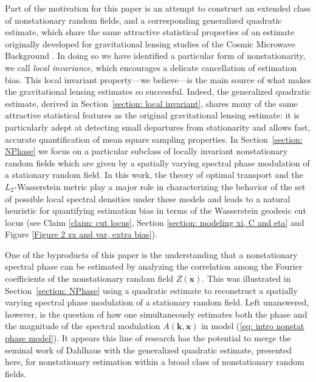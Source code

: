 \documentclass[10pt,noinfoline]{imsart}
\newcommand{\bs}{\boldsymbol}
\begin{document}
Part of the motivation for this paper is an attempt to construct an extended class of nonstationary random fields, and a corresponding generalized quadratic estimate, which share the same attractive statistical properties of an estimate originally developed for gravitational lensing studies of the Cosmic Microwave Background \cite{hu2001mapping, hu2002mass}.  In doing so we have identified a particular form of nonstationarity, we call {\it local invariance}, which encourages a delicate cancellation of estimation bias. This local invariant property---we believe---is the main source of what makes the gravitational lensing estimates so successful.  Indeed, the generalized quadratic estimate, derived in Section~\ref{section: local invariant}, shares many of the same attractive statistical features as the original gravitational lensing estimate: it is particularly adept at detecting small departures from stationarity and allows fast, accurate quantification of mean square sampling properties.  In Section~\ref{section: NPhase} we focus on a particular subclass of locally invariant nonstationary random fields which are given by a spatially varying spectral phase modulation of a stationary random field. In this work, the theory of optimal transport and the $L_2$-Wasserstein metric play a major role in characterizing the behavior of the set of possible local spectral densities under these models and leads to a natural heuristic for quantifying estimation bias in terms of the Wasserstein geodesic cut locus (see Claim \ref{claim: cut locus}, Section \ref{section: modeling xi, C and eta} and Figure \ref{Figure 2 zx and var, extra bias}).

One of the byproducts of this paper is the understanding that a nonstationary spectral phase can be estimated by analyzing the correlation among the Fourier coefficients of the nonstationary random field $Z(\bs x)$. This was illustrated in Section~\ref{section: NPhase} using a quadratic estimate to reconstruct a spatially varying spectral phase modulation of a stationary random field. Left unanswered, however, is the question of how one simultaneously estimates both the phase and the magnitude of the spectral modulation $A(\bs k, \bs x)$ in model (\ref{eq: intro nonstat phase model}). It appears this line of research has the potential to merge the seminal work of Dahlhaus \cite{dahlhaus1997fitting,dahlhaus2000likelihood} with the generalized quadratic estimate, presented here, for nonstationary estimation within a broad class of nonstationary random fields. 
\end{document}
